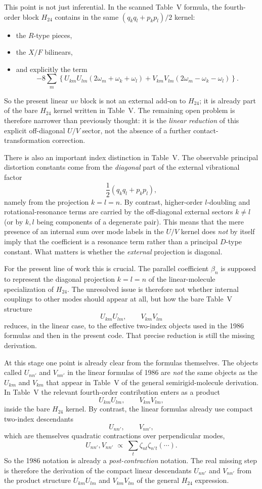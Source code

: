 \documentclass[11pt]{article}
\begin{document}
This point is not just inferential. In the scanned Table~V formula, the
fourth-order block $H_{24}$ contains in the same $(q_kq_l+p_kp_l)/2$ kernel:
\begin{itemize}
\item the $R$-type pieces,
\item the $X/F$ bilinears,
\item and explicitly the term
\[
-8\sum_m
\left\{
U_{km}U_{lm}(2\omega_m+\omega_k+\omega_l)
+
V_{km}V_{lm}(2\omega_m-\omega_k-\omega_l)
\right\}.
\]
\end{itemize}
So the present linear $uv$ block is not an external add-on to $H_{24}$; it is
already part of the bare $H_{24}$ kernel written in Table~V. The remaining
open problem is therefore narrower than previously thought: it is the
\emph{linear reduction} of this explicit off-diagonal $U/V$ sector, not the
absence of a further contact-transformation correction.

There is also an important index distinction in Table~V. The observable
principal distortion constants come from the \emph{diagonal} part of the
external vibrational factor
\[
\frac{1}{2}(q_kq_l+p_kp_l),
\]
namely from the projection $k=l=n$. By contrast, higher-order $l$-doubling and
rotational-resonance terms are carried by the off-diagonal external sectors
$k\neq l$ (or by $k,l$ being components of a degenerate pair). This means that
the mere presence of an internal sum over mode labels in the $U/V$ kernel does
\emph{not} by itself imply that the coefficient is a resonance term rather than
a principal $D$-type constant. What matters is whether the \emph{external}
projection is diagonal.

For the present line of work this is crucial. The parallel coefficient
$\beta_n$ is supposed to represent the diagonal projection $k=l=n$ of the
linear-molecule specialization of $H_{24}$. The unresolved issue is therefore
not whether internal couplings to other modes should appear at all, but how
the bare Table~V structure
\[
U_{km}U_{lm},\qquad V_{km}V_{lm}
\]
reduces, in the linear case, to the effective two-index objects used in the
1986 formulas and then in the present code. That precise reduction is still
the missing derivation.

At this stage one point is already clear from the formulas themselves. The
objects called $U_{nn'}$ and $V_{nn'}$ in the linear formulas of 1986 are
\emph{not} the same objects as the $U_{km}$ and $V_{km}$ that appear in
Table~V of the general semirigid-molecule derivation. In Table~V the relevant
fourth-order contribution enters as a product
\[
U_{km}U_{lm},\qquad V_{km}V_{lm},
\]
inside the bare $H_{24}$ kernel. By contrast, the linear formulas already use
compact two-index descendants
\[
U_{nn'},\qquad V_{nn'},
\]
which are themselves quadratic contractions over perpendicular modes,
\[
U_{nn'},V_{nn'}\;\propto\;\sum_t \zeta_{nt}\zeta_{n't}(\cdots).
\]
So the 1986 notation is already a \emph{post-contraction} notation. The real
missing step is therefore the derivation of the compact linear descendants
$U_{nn'}$ and $V_{nn'}$ from the product structure $U_{km}U_{lm}$ and
$V_{km}V_{lm}$ of the general $H_{24}$ expression.
\end{document}
